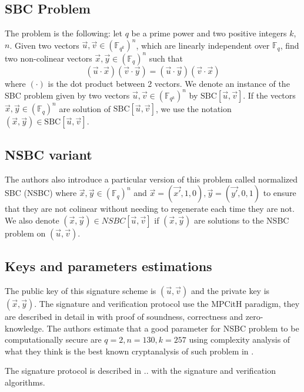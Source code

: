 \documentclass[english]{article}
\begin{document}
		\subsection{SBC Problem}
		The problem is the following: let $q$ be a prime power and two positive integers $k$, $n$.
		\newline
		Given two vectors $\vec{u}, \vec{v} \in (\mathbb{F}_{q^k})^n$, which are linearly independent over $\mathbb{F}_q$, find two non-colinear vectors $\vec{x}, \vec{y} \in (\mathbb{F}_q)^n$ such that $$(\vec{u} \cdot \vec{x})(\vec{v} \cdot \vec{y}) = (\vec{u} \cdot \vec{y})(\vec{v} \cdot \vec{x})$$
		where $(\cdot)$ is the dot product between 2 vectors.
		We denote an instance of the SBC problem given by two vectors $\vec{u}, \vec{v} \in (\mathbb{F}_{q^k})^n$ by $\text{SBC}[\vec{u}, \vec{v}]$. If the vectors $\vec{x},\vec{y} \in (\mathbb{F}_q)^n$ are solution of $\text{SBC}[\vec{u},\vec{v}]$, we use the notation $(\vec{x}, \vec{y}) \in \text{SBC}[\vec{u}, \vec{v}]$.
		
		\subsection{NSBC variant}
		
		The authors also introduce a particular version of this problem called normalized SBC (NSBC) where $\vec{x}, \vec{y} \in (\mathbb{F}_q)^n$ and
		$\vec{x} = (\vec{x'}, 1, 0), \vec{y} = (\vec{y'}, 0, 1)$ to ensure that they are not colinear without needing to regenerate each time they are not. We also denote $(\vec{x}, \vec{y}) \in NSBC[\vec{u}, \vec{v}]$ if $(\vec{x}, \vec{y})$ are solutions to the NSBC problem on $(\vec{u}, \vec{v})$.
 		
 		\subsection{Keys and parameters estimations}
		The public key of this signature scheme is $(\vec{u},\vec{v})$ and the private key is $(\vec{x}, \vec{y})$.
		The signature and verification protocol use the MPCitH paradigm, they are described in detail in \cite{HJ23} with proof of soundness, correctness and zero-knowledge.
		The authors estimate that a good parameter for NSBC problem to be computationally secure are $q = 2, n = 130, k = 257$ using complexity analysis of what they think is the best known cryptanalysis of such problem in \cite{FSS11}.
		
		The signature protocol is described in .. with the signature and verification algorithms.
		
\end{document}
